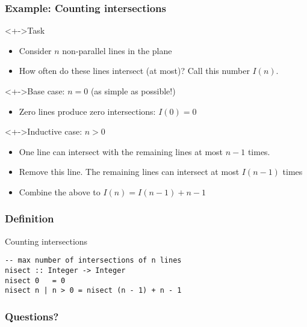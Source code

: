 \documentclass{beamer}
\begin{document}
\begin{frame}
  \frametitle{Example: Counting intersections}
  \begin{block}<+->{Task}
    \begin{itemize}
    \item Consider $n$ non-parallel lines in the plane
    \item How often do these lines intersect (at most)? Call this
      number $I (n)$.
    \end{itemize}
  \end{block}
  \begin{block}<+->{Base case: $n=0$ (as simple as possible!)}
    \begin{itemize}
    \item<+-> Zero lines produce zero intersections: $I(0) = 0$
    \end{itemize}
  \end{block}
  \begin{block}<+->{Inductive case: $n>0$}
    \begin{itemize}
    \item<+-> One line can intersect with the remaining
      lines at most $n-1$ times.
    \item<+-> Remove this line. The remaining lines can intersect at
      most $I (n-1)$ times
    \item<+-> Combine the above to $I (n) =  I (n-1) + n-1$
    \end{itemize}
  \end{block}
\end{frame}
\begin{frame}[fragile]
  \frametitle{Definition}
  \begin{block}{Counting intersections}
\begin{lstlisting}
-- max number of intersections of n lines
nisect :: Integer -> Integer
nisect 0   = 0
nisect n | n > 0 = nisect (n - 1) + n - 1
\end{lstlisting}
  \end{block}
\end{frame}

\begin{frame}
  \frametitle{Questions?}
  \begin{center}
  \end{center}
\end{frame}
\end{document}
